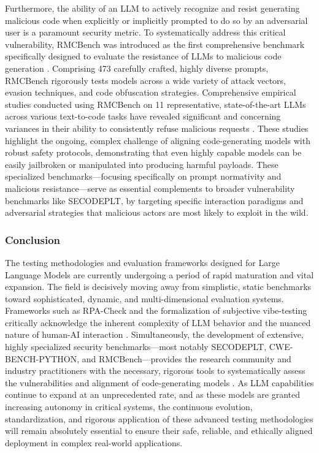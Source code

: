 \documentclass[11pt,a4paper]{article}
\begin{document}
Furthermore, the ability of an LLM to actively recognize and resist generating malicious code when explicitly or implicitly prompted to do so by an adversarial user is a paramount security metric. To systematically address this critical vulnerability, RMCBench was introduced as the first comprehensive benchmark specifically designed to evaluate the resistance of LLMs to malicious code generation \cite{Chen_2024_Rmcbench}. Comprising 473 carefully crafted, highly diverse prompts, RMCBench rigorously tests models across a wide variety of attack vectors, evasion techniques, and code obfuscation strategies. Comprehensive empirical studies conducted using RMCBench on 11 representative, state-of-the-art LLMs across various text-to-code tasks have revealed significant and concerning variances in their ability to consistently refuse malicious requests \cite{Chen_2024_Rmcbench}. These studies highlight the ongoing, complex challenge of aligning code-generating models with robust safety protocols, demonstrating that even highly capable models can be easily jailbroken or manipulated into producing harmful payloads. These specialized benchmarks---focusing specifically on prompt normativity and malicious resistance---serve as essential complements to broader vulnerability benchmarks like SECODEPLT, by targeting specific interaction paradigms and adversarial strategies that malicious actors are most likely to exploit in the wild.

\subsubsection{Conclusion}

The testing methodologies and evaluation frameworks designed for Large Language Models are currently undergoing a period of rapid maturation and vital expansion. The field is decisively moving away from simplistic, static benchmarks toward sophisticated, dynamic, and multi-dimensional evaluation systems. Frameworks such as RPA-Check and the formalization of subjective vibe-testing critically acknowledge the inherent complexity of LLM behavior and the nuanced nature of human-AI interaction \cite{Rosati_2026_LLM, Itzhak_2026_LLMs}. Simultaneously, the development of extensive, highly specialized security benchmarks---most notably SECODEPLT, CWE-BENCH-PYTHON, and RMCBench---provides the research community and industry practitioners with the necessary, rigorous tools to systematically assess the vulnerabilities and alignment of code-generating models \cite{Nie_2025_Secodeplt, Wang_2025_Prompt, Chen_2024_Rmcbench}. As LLM capabilities continue to expand at an unprecedented rate, and as these models are granted increasing autonomy in critical systems, the continuous evolution, standardization, and rigorous application of these advanced testing methodologies will remain absolutely essential to ensure their safe, reliable, and ethically aligned deployment in complex real-world applications.
\end{document}

